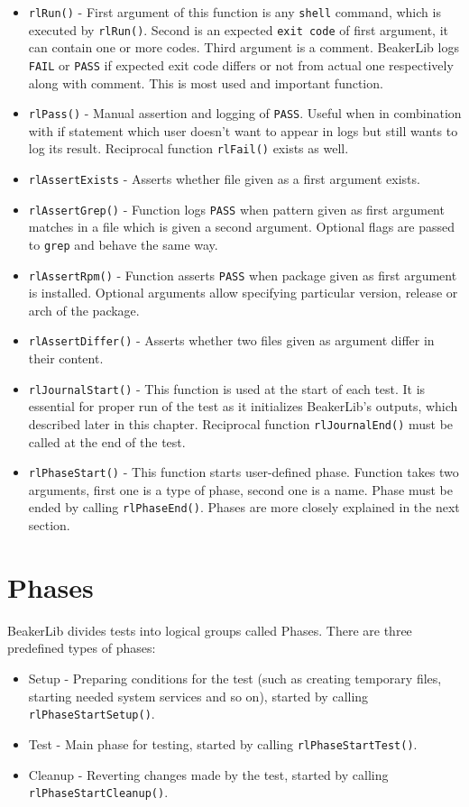 \begin{itemize}
\item \texttt{rlRun()} - First argument of this function is any \texttt{shell} command, which is executed by \texttt{rlRun()}. Second is an expected \texttt{exit code} of first argument, it can contain one or more codes. Third argument is a comment. BeakerLib logs \texttt{FAIL} or \texttt{PASS} if expected exit code differs or not from actual one respectively along with comment. This is most used and important function.
\item \texttt{rlPass()} - Manual assertion and logging of \texttt{PASS}. Useful when in combination with if statement which user doesn't want to appear in logs but still wants to log its result. Reciprocal function \texttt{rlFail()} exists as well.
\item \texttt{rlAssertExists} - Asserts whether file given as a first argument exists.
\item \texttt{rlAssertGrep()} - Function logs \texttt{PASS} when pattern given as first argument matches in a file which is given a second argument. Optional flags are passed to \texttt{grep} and behave the same way.
\item \texttt{rlAssertRpm()} - Function asserts \texttt{PASS} when package given as first argument is installed.  Optional arguments allow specifying particular version, release or arch of the package.
\item \texttt{rlAssertDiffer()} - Asserts whether two files given as argument differ in their content. 
\item \texttt{rlJournalStart()} - This function is used at the start of each test. It is essential for proper run of the test as it initializes BeakerLib's  outputs, which described later in this chapter. Reciprocal function \texttt{rlJournalEnd()} must be called at the end of the test.
\item \texttt{rlPhaseStart()} - This function starts user-defined phase. Function takes two arguments, first one is a type of phase, second one is a name. Phase must be ended by calling \texttt{rlPhaseEnd()}. Phases are more closely explained in the next section.
\end{itemize}

\section{Phases}
BeakerLib divides tests into logical groups called Phases. There are three predefined types of phases:
\begin{itemize}
\item Setup - Preparing conditions for the test (such as creating temporary files, starting needed system services and so on), started by calling \texttt{rlPhaseStartSetup()}.
\item Test - Main phase for testing, started by calling \texttt{rlPhaseStartTest()}.
\item Cleanup - Reverting changes made by the test, started by calling \mbox{\texttt{rlPhaseStartCleanup()}}.
\end{itemize}

